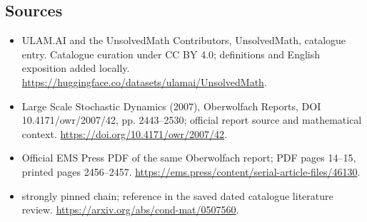 \documentclass[11pt]{article}
\begin{document}
\subsection{Sources}
\begin{itemize}
\item[\hypertarget{source:statement:1}{S1}] ULAM.AI and the UnsolvedMath Contributors, UnsolvedMath, catalogue entry. Catalogue curation under CC BY 4.0; definitions and English exposition added locally.
\url{https://huggingface.co/datasets/ulamai/UnsolvedMath}.
\item[\hypertarget{source:statement:2}{S2}] Large Scale Stochastic Dynamics (2007), Oberwolfach Reports, DOI 10.4171/owr/2007/42, pp. 2443--2530; official report source and mathematical context.
\url{https://doi.org/10.4171/owr/2007/42}.
\item[\hypertarget{source:statement:3}{S3}] Official EMS Press PDF of the same Oberwolfach report; PDF pages 14--15, printed pages 2456--2457.
\url{https://ems.press/content/serial-article-files/46130}.
\item[\hypertarget{source:statement:4}{S4}] strongly pinned chain; reference in the saved dated catalogue literature review.
\url{https://arxiv.org/abs/cond-mat/0507560}.
\end{itemize}
\label{end:statement}
\end{document}
